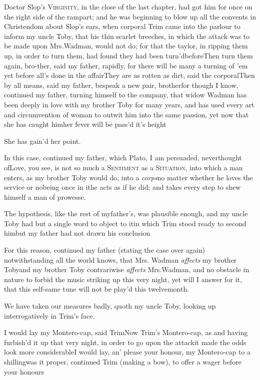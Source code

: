 \documentclass{article}
\begin{document}
Doctor Slop’s \textsc{Virginity}, in the
close of the last chapter, had got him for once on the right side
of the rampart; and he was beginning to blow up all the convents in
Christendom about Slop’s ears, when corporal
Trim came into the parlour to inform my uncle Toby,
that his thin scarlet breeches, in which the attack was to be made
upon Mrs.\@ Wadman, would not do; for that the taylor, in
ripping them up, in order to turn them, had found they had been
turn’d\pb before\tsh Then turn them again, bro-\break ther,
said my father, rapidly, for there will be many a turning of
’em yet before all’s done in the
affair\tsh They are as rotten as dirt, said the
corporal\tsh\break Then by all means, said my father, bespeak a
new pair, brother\tsh for though I know, continued my
father, turning himself to the company, that widow Wadman
has been deeply in love with my brother Toby for many years,
and has used every art and circumvention of woman to outwit him
into the same passion, yet now that she has caught
him\tsh her fever will be pass’d it’s\break
height\tsh

\tsh She has gain’d her point.

In this case, continued my father, which Plato, I am
persuaded, never\pb thought of\tsh Love, you see, is not so
much a \textsc{Sentiment} as a \textsc{Situation}, into
which a man enters, as my brother Toby would do, into a
\textit{corps}\tsh no matter whether he loves the service or
no\tsh being once in it\tsk he acts as if he did; and
takes every step to shew himself a man of prowesse.

The hypothesis, like the rest of my\break father’s, was
plausible enough, and my uncle Toby had but a single word to
object to it\tsk in which Trim stood ready to second
him\tsh but my father had not drawn his
conclusion\tsh

For this reason, continued my father (stating the case over
again) notwithstanding all the world knows, that Mrs.\pb
Wadman \textit{affects} my brother Toby\tsk and my brother
Toby contrariwise \textit{affects} Mrs.\@ Wadman, and no
obstacle in nature to forbid the music striking up this very night,
yet will I answer for it, that this self-same tune will not be
play’d this twelvemonth.

We have taken our measures badly, quoth my uncle Toby,
looking up interrogatively in Trim’s face.

I would lay my Montero-cap, said
Trim\tsh Now Trim’s
Montero-cap, as\break
{}
and having furbish’d it up that very night, in
order to go upon the attack\tsk it made the odds look more
considerable\break\null\tsh I would lay, an’ please your
honour, my Montero-cap to a shilling\tsk \pb was it proper,
continued Trim (making a bow), to offer a wager before your
honours\tsh
\end{document}
